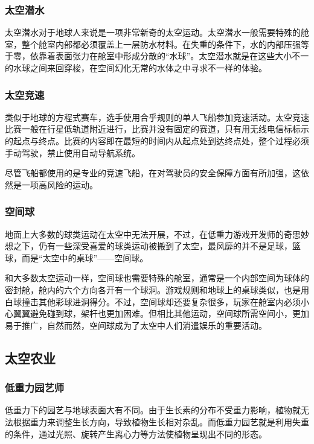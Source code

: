 \documentclass[letterpaper,10pt]{sphinxmanual}
\begin{document}
\subsubsection{太空潜水}
\label{profession:id16}
太空潜水对于地球人来说是一项非常新奇的太空运动。太空潜水一般需要特殊的舱室，整个舱室内部都必须覆盖上一层防水材料。在失重的条件下，水的内部压强等于零，依靠着表面张力在舱室中形成分散的“水球”。太空潜水就是在这些大小不一的水球之间来回穿梭，在空间幻化无常的水体之中寻求不一样的体验。


\subsubsection{太空竞速}
\label{profession:id17}
类似于地球的方程式赛车，选手使用合乎规则的单人飞船参加竞速活动。太空竞速比赛一般在行星低轨道附近进行，比赛并没有固定的赛道，只有用无线电信标标示的起点与终点。比赛的内容即在最短的时间内从起点处到达终点处，整个过程必须手动驾驶，禁止使用自动导航系统。

尽管飞船都使用的是专业的竞速飞船，在对驾驶员的安全保障方面有所加强，这依然是一项高风险的运动。


\subsubsection{空间球}
\label{profession:id18}
地面上大多数的球类运动在太空中无法开展，不过，在低重力游戏开发师的奇思妙想之下，仍有一些深受喜爱的球类运动被搬到了太空，最风靡的并不是足球，篮球，而是“太空中的桌球”——空间球。

和大多数太空运动一样，空间球也需要特殊的舱室，通常是一个内部空间为球体的密封舱，舱内的六个方向各开有一个球洞。游戏规则和地球上的桌球类似，也是用白球撞击其他彩球进洞得分。不过，空间球却还要复杂很多，玩家在舱室内必须小心翼翼避免碰到球，架杆也更加困难。但相比其他运动，空间球所需空间小，更加易于推广，自然而然，空间球成为了太空中人们消遣娱乐的重要活动。


\subsection{太空农业}
\label{profession:id19}

\subsubsection{低重力园艺师}
\label{profession:id20}
低重力下的园艺与地球表面大有不同。由于生长素的分布不受重力影响，植物就无法根据重力来调整生长方向，导致植物生长相对杂乱。而低重力园艺就是利用失重的条件，通过光照、旋转产生离心力等方法使植物呈现出不同的形态。
\end{document}
